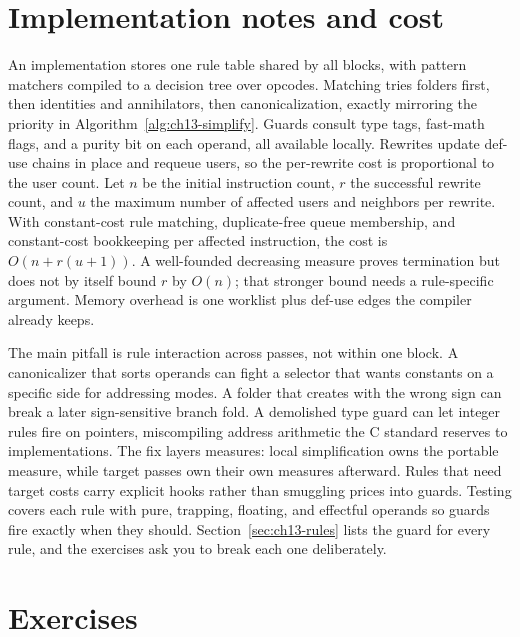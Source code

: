 \section{Implementation notes and cost}
\label{sec:ch13-implementation}

An implementation stores one rule table shared by all blocks, with pattern matchers compiled to a decision tree over opcodes.
Matching tries folders first, then identities and annihilators, then canonicalization, exactly mirroring the priority in Algorithm~\ref{alg:ch13-simplify}.
Guards consult type tags, fast-math flags, and a purity bit on each operand, all available locally.
Rewrites update def-use chains in place and requeue users, so the per-rewrite cost is proportional to the user count.
Let $n$ be the initial instruction count, $r$ the successful rewrite count, and $u$ the maximum number of affected users and neighbors per rewrite.
With constant-cost rule matching, duplicate-free queue membership, and constant-cost bookkeeping per affected instruction, the cost is $O(n+r(u+1))$.
A well-founded decreasing measure proves termination but does not by itself bound $r$ by $O(n)$; that stronger bound needs a rule-specific argument.
Memory overhead is one worklist plus def-use edges the compiler already keeps.

The main pitfall is rule interaction across passes, not within one block.
A canonicalizer that sorts operands can fight a selector that wants constants on a specific side for addressing modes.
A folder that creates  with the wrong sign can break a later sign-sensitive branch fold.
A demolished type guard can let integer rules fire on pointers, miscompiling address arithmetic the C standard reserves to implementations.
The fix layers measures: local simplification owns the portable measure, while target passes own their own measures afterward.
Rules that need target costs carry explicit hooks rather than smuggling prices into guards.
Testing covers each rule with pure, trapping, floating, and effectful operands so guards fire exactly when they should.
Section~\ref{sec:ch13-rules} lists the guard for every rule, and the exercises ask you to break each one deliberately.

\section{Exercises}
\label{sec:ch13-exercises}

